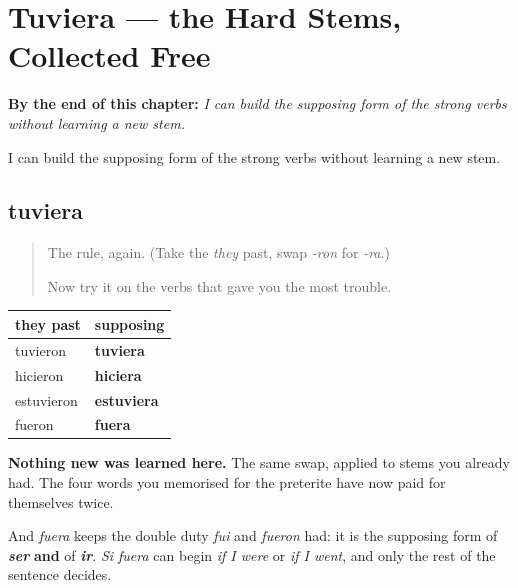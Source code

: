 
\chapter{Tuviera --- the Hard Stems, Collected Free}
\label{ch:tuviera}

\begin{chapteropening}
\textbf{By the end of this chapter:} \emph{I can build the supposing form of the strong verbs without learning a new stem.}

I can build the supposing form of the strong verbs without learning a new stem.
\end{chapteropening}

\section[tuviera]{tuviera}

\label{lesson:ES-C56-tuviera}



\begin{quote}
The rule, again. (Take the \emph{they} past, swap \emph{-ron} for \emph{-ra}.)

Now try it on the verbs that gave you the most trouble.
\end{quote}

\begin{grammarlens}[title={Grammar Lens: the hard ones cost nothing}]
\noindent
\begin{tabularx}{\linewidth}{@{}>{\raggedright\arraybackslash}X>{\raggedright\arraybackslash}X@{}}
\toprule
\textbf{they past} & \textbf{supposing} \\
\midrule
tuvieron & \textbf{tuviera} \\
hicieron & \textbf{hiciera} \\
estuvieron & \textbf{estuviera} \\
fueron & \textbf{fuera} \\
\bottomrule
\end{tabularx}

\textbf{Nothing new was learned here.} The same swap, applied to stems you already had. The four words you memorised for the preterite have now paid for themselves twice.

And \emph{fuera} keeps the double duty \emph{fui} and \emph{fueron} had: it is the supposing form of \emph{\textbf{ser}} \textbf{and} of \emph{\textbf{ir}}. \emph{Si fuera} can begin \emph{if I were} or \emph{if I went}, and only the rest of the sentence decides.
\end{grammarlens}

